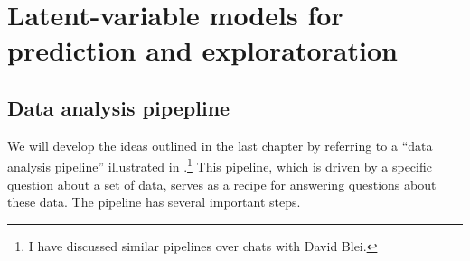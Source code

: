 \label{section:pipeline}

\section{Latent-variable models for prediction and exploratoration}

\subsection{Data analysis pipepline}
\label{section:data_analysis_pipeline}
We will develop the ideas outlined in the last chapter by referring to
a ``data analysis pipeline'' illustrated in
.\footnote{I have discussed similar
  pipelines over chats with David Blei.}  This pipeline, which is
driven by a specific question about a set of data, serves as a recipe
for answering questions about these data.  The pipeline has several
important steps.

